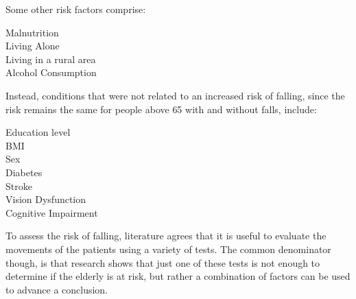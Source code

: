 Some other risk factors comprise:
\begin{description}
  \item[Malnutrition]
  \item[Living Alone]
  \item[Living in a rural area]
  \item[Alcohol Consumption]
\end{description}

Instead, conditions that were not related to an increased risk of falling, since the risk remains the same for people above 65 with and without falls, include:
\begin{description}
  \item[Education level]
  \item[BMI]
  \item[Sex]
  \item[Diabetes]
  \item[Stroke]
  \item[Vision Dysfunction]
  \item[Cognitive Impairment]
\end{description}

To assess the risk of falling, literature agrees that it is useful to evaluate the movements of the patients using a variety of tests. The common denominator though, is that research shows that just one of these tests is not enough to determine if the elderly is at risk, but rather a combination of factors can be used to advance a conclusion.

